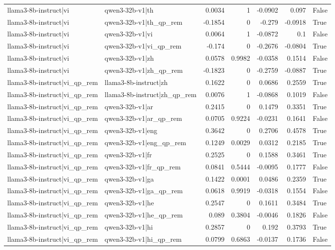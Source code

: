 \begin{table}
\begin{tabular}{l l r r r r l}
llama3-8b-instruct|vi & qwen3-32b-v1|th & 0.0034 & 1 & -0.0902 & 0.097 & False \\
llama3-8b-instruct|vi & qwen3-32b-v1|th_qp_rem & -0.1854 & 0 & -0.279 & -0.0918 & True \\
llama3-8b-instruct|vi & qwen3-32b-v1|vi & 0.0064 & 1 & -0.0872 & 0.1 & False \\
llama3-8b-instruct|vi & qwen3-32b-v1|vi_qp_rem & -0.174 & 0 & -0.2676 & -0.0804 & True \\
llama3-8b-instruct|vi & qwen3-32b-v1|zh & 0.0578 & 0.9982 & -0.0358 & 0.1514 & False \\
llama3-8b-instruct|vi & qwen3-32b-v1|zh_qp_rem & -0.1823 & 0 & -0.2759 & -0.0887 & True \\
llama3-8b-instruct|vi_qp_rem & llama3-8b-instruct|zh & 0.1622 & 0 & 0.0686 & 0.2559 & True \\
llama3-8b-instruct|vi_qp_rem & llama3-8b-instruct|zh_qp_rem & 0.0076 & 1 & -0.0868 & 0.1019 & False \\
llama3-8b-instruct|vi_qp_rem & qwen3-32b-v1|ar & 0.2415 & 0 & 0.1479 & 0.3351 & True \\
llama3-8b-instruct|vi_qp_rem & qwen3-32b-v1|ar_qp_rem & 0.0705 & 0.9224 & -0.0231 & 0.1641 & False \\
llama3-8b-instruct|vi_qp_rem & qwen3-32b-v1|eng & 0.3642 & 0 & 0.2706 & 0.4578 & True \\
llama3-8b-instruct|vi_qp_rem & qwen3-32b-v1|eng_qp_rem & 0.1249 & 0.0029 & 0.0312 & 0.2185 & True \\
llama3-8b-instruct|vi_qp_rem & qwen3-32b-v1|fr & 0.2525 & 0 & 0.1588 & 0.3461 & True \\
llama3-8b-instruct|vi_qp_rem & qwen3-32b-v1|fr_qp_rem & 0.0841 & 0.5444 & -0.0095 & 0.1777 & False \\
llama3-8b-instruct|vi_qp_rem & qwen3-32b-v1|ga & 0.1422 & 0.0001 & 0.0486 & 0.2359 & True \\
llama3-8b-instruct|vi_qp_rem & qwen3-32b-v1|ga_qp_rem & 0.0618 & 0.9919 & -0.0318 & 0.1554 & False \\
llama3-8b-instruct|vi_qp_rem & qwen3-32b-v1|he & 0.2547 & 0 & 0.1611 & 0.3484 & True \\
llama3-8b-instruct|vi_qp_rem & qwen3-32b-v1|he_qp_rem & 0.089 & 0.3804 & -0.0046 & 0.1826 & False \\
llama3-8b-instruct|vi_qp_rem & qwen3-32b-v1|hi & 0.2857 & 0 & 0.192 & 0.3793 & True \\
llama3-8b-instruct|vi_qp_rem & qwen3-32b-v1|hi_qp_rem & 0.0799 & 0.6863 & -0.0137 & 0.1736 & False \\

\end{tabular}
\end{table}
